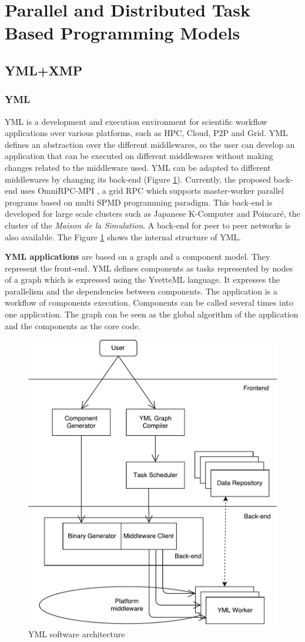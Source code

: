 \section{Parallel and Distributed Task Based Programming Models}
\subsection{YML+XMP}

\subsubsection{YML}
YML \cite{DelaP2004} \cite{DelEP2006} is a development and execution environment for scientific workflow applications over various platforms, such as HPC, Cloud, P2P and Grid.
YML defines an abstraction over the different middlewares, so the user can develop an application that can be executed on different middlewares without making changes related to the middleware used.
YML can be adapted to different middlewares by changing its back-end (Figure \ref{fig:schema}).
Currently, the proposed back-end \cite{TsSHP2013} \cite{TsuPS2015} uses OmniRPC-MPI \cite{SaHTS2001} \cite{SatBT2003}, a grid RPC which supports master-worker parallel programs based on multi SPMD programming paradigm.
This back-end is developed for large scale clusters such as Japanese K-Computer and Poincar\'e, the cluster of the \textit{Maison de la Simulation}.
A back-end for peer to peer networks is also available.
The Figure \ref{fig:schema} shows the internal structure of YML.

\textbf{YML applications} are based on a graph and a component model.
They represent the front-end.
YML defines components as tasks represented by nodes of a graph which is expressed using the YvetteML language.
It expresses the parallelism and the dependencies between components.
The application is a workflow of components execution.
Components can be called several times into one application.
The graph can be seen as the global algorithm of the application and the components as the core code.

\begin{figure}[h]
	\caption{YML software architecture \label{fig:schema}}
	\medskip
	\centering
	\includegraphics[width=.5\textwidth]{schema.pdf}
\end{figure}

